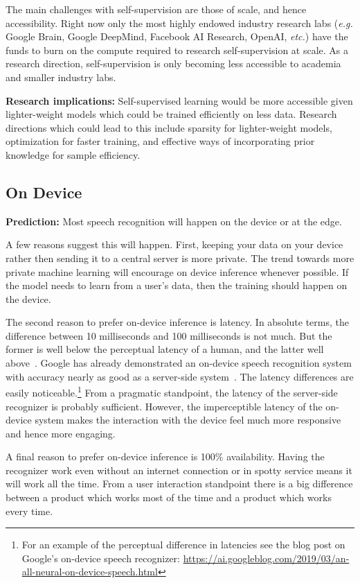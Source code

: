 The main challenges with self-supervision are those of scale, and hence
accessibility. Right now only the most highly endowed industry research labs
(\emph{e.g.} Google Brain, Google DeepMind, Facebook AI Research, OpenAI,
\emph{etc.}) have the funds to burn on the compute required to research
self-supervision at scale. As a research direction, self-supervision is only
becoming less accessible to academia and smaller industry labs.

{\bf Research implications:} Self-supervised learning would be more accessible
given lighter-weight models which could be trained efficiently on less data.
Research directions which could lead to this include sparsity for
lighter-weight models, optimization for faster training, and effective ways of
incorporating prior knowledge for sample efficiency.

\subsection{On Device}
\label{sec:on_device}

{\bf Prediction:} Most speech recognition will happen on the device or at the
edge.

A few reasons suggest this will happen. First, keeping your data on your device
rather then sending it to a central server is more private. The trend
towards more private machine learning will encourage on device inference
whenever possible. If the model needs to learn from a user's data, then the
training should happen on the device.

The second reason to prefer on-device inference is latency. In absolute terms,
the difference between 10 milliseconds and 100 milliseconds is not much.  But
the former is well below the perceptual latency of a human, and the latter well
above~\citep{lago2004quest, levitin2000perception}.  Google has already
demonstrated an on-device speech recognition system with accuracy nearly as
good as a server-side system~\citep{he2019streaming}. The latency differences
are easily noticeable.\footnote{For an example of the perceptual difference in
latencies see the blog post on Google's on-device speech recognizer:
\url{https://ai.googleblog.com/2019/03/an-all-neural-on-device-speech.html}}
From a pragmatic standpoint, the latency of the server-side recognizer is
probably sufficient. However, the imperceptible latency of the on-device system
makes the interaction with the device feel much more responsive and hence more
engaging.

A final reason to prefer on-device inference is 100\% availability. Having the
recognizer work even without an internet connection or in spotty service means
it will work all the time. From a user interaction standpoint there is a big
difference between a product which works most of the time and a product which
works every time.

